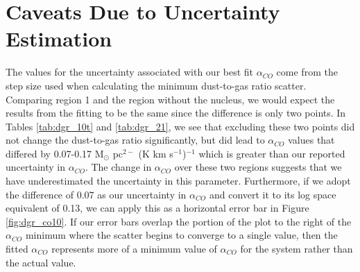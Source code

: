 \section{Caveats Due to Uncertainty Estimation}

The values for the uncertainty associated with our best fit $\alpha_{CO}$ come from the step size used when calculating the minimum dust-to-gas ratio scatter.  Comparing region 1 and the region without the nucleus, we would expect the results from the fitting to be the same since the difference is only two points.  In Tables \ref{tab:dgr_10t} and \ref{tab:dgr_21}, we see that excluding these two points did not change the dust-to-gas ratio significantly, but did lead to $\alpha_{CO}$ values that differed by 0.07-0.17 M$_\odot$ pc$^{2-}$ (K km s$^{-1}$)$^{-1}$ which is greater than our reported uncertainty in $\alpha_{CO}$.  The change in $\alpha_{CO}$ over these two regions suggests that we have underestimated the uncertainty in this parameter.  Furthermore, if we adopt the difference of 0.07 as our uncertainty in $\alpha_{CO}$ and convert it to its log space equivalent of 0.13, we can apply this as a horizontal error bar in Figure \ref{fig:dgr_co10}.  If our error bars overlap the portion of the plot to the right of the $\alpha_{CO}$ minimum where the scatter begins to converge to a single value, then the fitted $\alpha_{CO}$ represents more of a minimum value of $\alpha_{CO}$ for the system rather than the actual value.
